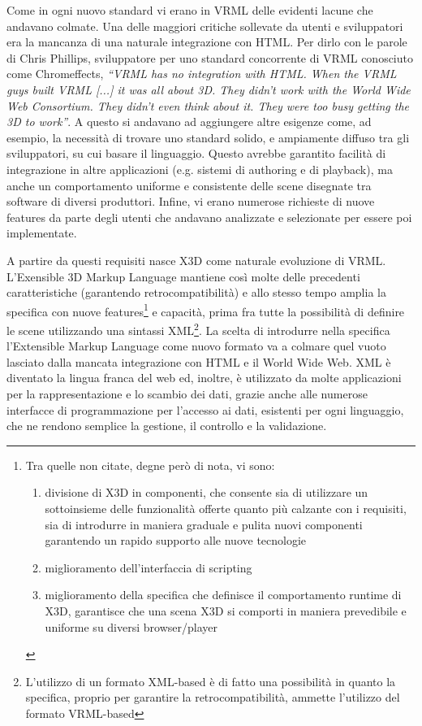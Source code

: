 Come in ogni nuovo standard vi erano in VRML delle evidenti lacune che andavano colmate. Una delle maggiori critiche sollevate da utenti e sviluppatori era la mancanza di una naturale integrazione con HTML. Per dirlo con le parole di Chris Phillips, sviluppatore per uno standard concorrente di VRML conosciuto come Chromeffects, \textit{``VRML has no integration with HTML. When the VRML guys built VRML [...] it was all about 3D. They didn't work with the World Wide Web Consortium. They didn't even think about it. They were too busy getting the 3D to work''}. A questo si andavano ad aggiungere altre esigenze come, ad esempio, la necessità di trovare uno standard solido, e ampiamente diffuso tra gli sviluppatori, su cui basare il linguaggio. Questo avrebbe garantito facilità di integrazione in altre applicazioni (e.g. sistemi di authoring e di playback), ma anche un comportamento uniforme e consistente delle scene disegnate tra software di diversi produttori. Infine, vi erano numerose richieste di nuove features da parte degli utenti che andavano analizzate e selezionate per essere poi implementate.

A partire da questi requisiti nasce X3D come naturale evoluzione di VRML. L'Exensible 3D Markup Language mantiene cos\`{i} molte delle precedenti caratteristiche (garantendo retrocompatibilità) e allo stesso tempo amplia la specifica con nuove features\footnote{Tra quelle non citate, degne però di nota,  vi sono:
\begin{enumerate} 
    \item divisione di X3D in componenti, che consente sia di utilizzare un sottoinsieme delle funzionalità offerte quanto più calzante con i requisiti, sia di introdurre in maniera graduale e pulita nuovi componenti garantendo un rapido supporto alle nuove tecnologie
    \item miglioramento dell'interfaccia di scripting
    \item miglioramento della specifica che definisce il comportamento runtime di X3D, garantisce che una scena X3D si comporti in maniera prevedibile e uniforme su diversi browser/player
\end{enumerate}} e capacità, prima fra tutte la possibilità di definire le scene utilizzando una sintassi XML\footnote{L'utilizzo di un formato XML-based è di fatto una possibilità in quanto la specifica, proprio per garantire la retrocompatibilità, ammette l'utilizzo del formato VRML-based}. La scelta di introdurre nella specifica l'Extensible Markup Language come nuovo formato va a colmare quel vuoto lasciato dalla mancata integrazione con HTML e il World Wide Web. XML è diventato la lingua franca del web ed, inoltre, è utilizzato da molte applicazioni per la rappresentazione e lo scambio dei dati, grazie anche alle numerose interfacce di programmazione per l'accesso ai dati, esistenti per ogni linguaggio, che ne rendono semplice la gestione, il controllo e la validazione.

